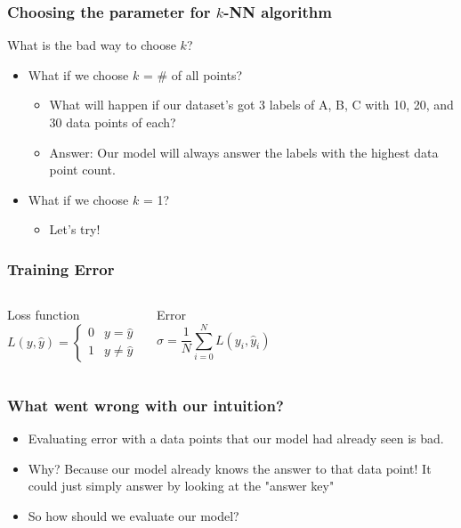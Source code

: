 \documentclass[aspectratio=169]{beamer}
\begin{document}
\begin{frame}
	\frametitle{Choosing the parameter for $k$-NN algorithm}
	 What is the bad way to choose $k$?
	\begin{itemize}
		\item<3-> What if we choose $k$ = \# of all points?
		      \begin{itemize}
			      \item<4-> What will happen if our dataset's got 3 labels of A, B, C with 10, 20, and 30 data points of each?
			      \item<5-> Answer: Our model will always answer the labels with the highest data point count.
		      \end{itemize}
		\item<6-> What if we choose $k$ = 1?
		      \begin{itemize}
			      \item<7-> Let's try!
		      \end{itemize}
	\end{itemize}
\end{frame}

\begin{frame}
	\frametitle{Training Error}
	\begin{figure}
	\end{figure}
	\begin{columns}[t]
		\begin{block}{Loss function}
			$$L(y, \hat{y}) =
				\begin{cases}
					0 & y = \hat{y}    \\
					1 & y \neq \hat{y}
				\end{cases}
			$$
		\end{block}
		\begin{block}{Error}
			$$\sigma = \frac{1}{N}\sum_{i=0}^{N}L(y_i, \hat{y}_i)$$
		\end{block}
	\end{columns}
\end{frame}

\begin{frame}
	\frametitle{What went wrong with our intuition?}
	\begin{itemize}
		\item Evaluating error with a data points that our model had already seen is bad.
		\item Why? Because our model already knows the answer to that data point! It could just simply answer by looking at the "answer key"
		\item So how should we evaluate our model?
	\end{itemize}
\end{frame}
\end{document}
